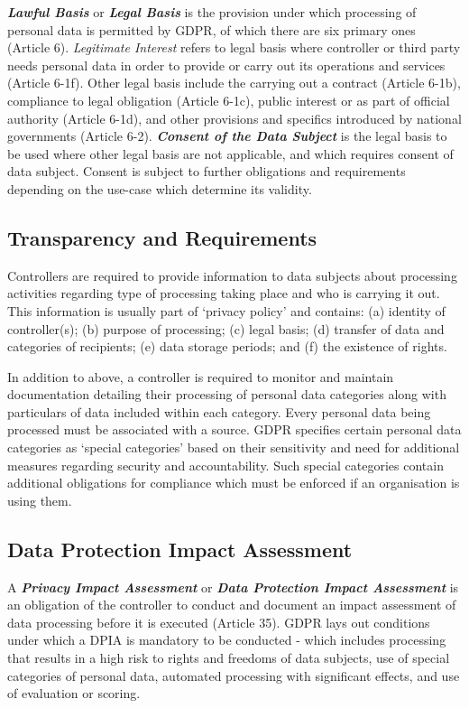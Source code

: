 \textit{\textbf{Lawful Basis}} or \textit{\textbf{Legal Basis}} is the provision under which processing of personal data is permitted by GDPR, of which there are six primary ones (Article 6). \textit{Legitimate Interest} refers to legal basis where controller or third party needs personal data in order to provide or carry out its operations and services (Article 6-1f). Other legal basis include the carrying out a contract (Article 6-1b), compliance to legal obligation (Article 6-1c), public interest or as part of official authority (Article 6-1d), and other provisions and specifics introduced by national governments (Article 6-2).
\textit{\textbf{Consent of the Data Subject}} is the legal basis to be used where other legal basis are not applicable, and which requires consent of  data subject. Consent is subject to further obligations and requirements depending on the use-case which determine its validity.

\subsection{Transparency and Requirements}
Controllers are required to provide information to data subjects about processing activities regarding type of processing taking place and who is carrying it out.
This information is usually part of `privacy policy' and contains: (a) identity of controller(s); (b) purpose of processing; (c) legal basis; (d) transfer of data and categories of recipients; (e) data storage periods; and (f) the existence of rights.

In addition to above, a controller is required to monitor and maintain documentation detailing their processing of personal data categories along with particulars of data included within each category. Every personal data being processed must be associated with a source. GDPR specifies certain personal data categories as `special categories' based on their sensitivity and need for additional measures regarding security and accountability. Such special categories contain additional obligations for compliance which must be enforced if an organisation is using them. 

\subsection{Data Protection Impact Assessment}
A \textit{\textbf{Privacy Impact Assessment}} or \textit{\textbf{Data Protection Impact Assessment}} is an obligation of the controller to conduct and document an impact assessment of data processing before it is executed (Article 35). GDPR lays out conditions under which a DPIA is mandatory to be conducted - which includes processing that results in a high risk to rights and freedoms of data subjects, use of special categories of personal data, automated processing with significant effects, and use of evaluation or scoring.

